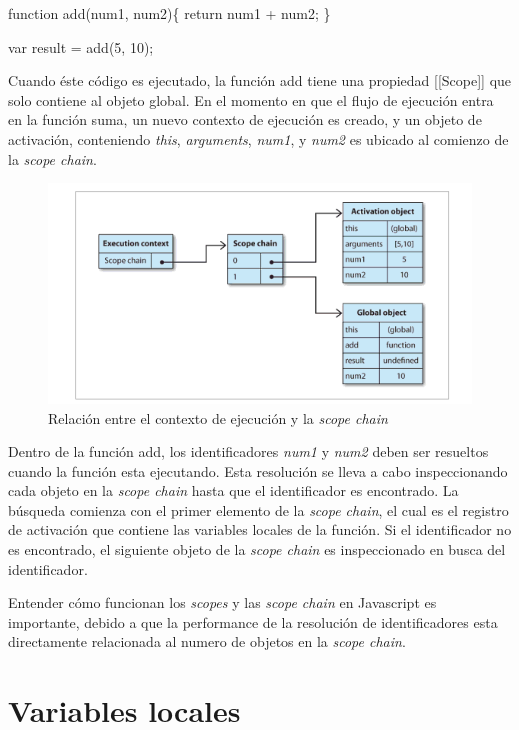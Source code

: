 \begin{em}
function add(num1, num2)\{
    return num1 + num2;
\}

var result = add(5, 10);
\end{em}

Cuando éste código es ejecutado, la función add tiene una propiedad [[Scope]] que solo contiene al objeto global. En el momento en que el flujo de ejecución entra en la función
suma, un nuevo contexto de ejecución es creado, y un objeto de activación, conteniendo \emph{this}, \emph{arguments}, \emph{num1}, y \emph{num2} es ubicado al comienzo
de la \emph{scope chain}.

\begin{figure}[h]
\centering
\includegraphics[width=1\textwidth]{figuras/scope_chain.png}
	\caption{Relación entre el contexto de ejecución y la \emph{scope chain}}
    \label{fig.scope_chain}
\end{figure}

Dentro de la función add, los identificadores \emph{num1} y \emph{num2} deben ser resueltos cuando la función esta ejecutando. Esta resolución se lleva a cabo inspeccionando
cada objeto en la \emph{scope chain} hasta que el identificador es encontrado. La búsqueda comienza con el primer elemento de la \emph{scope chain}, el cual es el registro
de activación que contiene las variables locales de la función. Si el identificador no es encontrado, el siguiente objeto de la \emph{scope chain} es inspeccionado en busca del
identificador.

Entender cómo funcionan los \emph{scopes} y las \emph{scope chain} en Javascript es importante, debido a que la performance de la resolución de identificadores esta directamente
relacionada al numero de objetos en la \emph{scope chain}.

\section{Variables locales}

